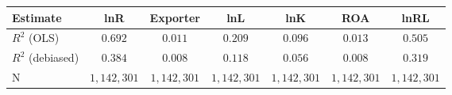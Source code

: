 \begin{tabular}{l*{6}{c}}
\hline\hline
 Estimate & lnR & Exporter & lnL & lnK & ROA & lnRL \\
\hline
\addlinespace $ R^2$ (OLS) & $0.692$ & $0.011$ & $0.209$ & $0.096$ & $0.013$ & $0.505$ \\
$ R^2$ (debiased) & $0.384$ & $0.008$ & $0.118$ & $0.056$ & $0.008$ & $0.319$ \\
N & $1,142,301$ & $1,142,301$ & $1,142,301$ & $1,142,301$ & $1,142,301$ & $1,142,301$ \\
\hline\hline
\end{tabular}
